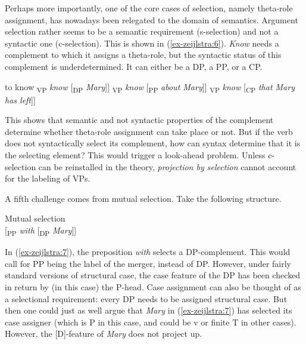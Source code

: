 \documentclass[output=paper
,modfonts
,nonflat]{langsci/langscibook}
\begin{document}
Perhaps more importantly, one of the core cases of selection, namely theta-role assignment, has nowadays been relegated to the domain of semantics. Argument selection rather seems to be a semantic requirement (s-selection) and not a syntactic one (c-selection). This is shown in (\ref{ex-zeijlstra:6}). \textit{Know} needs a complement to which it assigns a theta-role, but the syntactic status of this complement is underdetermined. It can either be a DP, a PP, or a CP. 

\begin{exe}
\ex to know \label{ex-zeijlstra:6}
	\xlist
	\ex {[}\textsubscript{VP} \textit{know} {[}\textsubscript{DP}
		\textit{Mary}{]}{]}
	\ex {[}\textsubscript{VP} \textit{know} {[}\textsubscript{PP} 	
		\textit{about Mary}{]}{]}
	\ex {[}\textsubscript{VP} \textit{know} {[}\textsubscript{CP} 		
		\textit{that Mary has left}{]}{]}
	\endxlist
\end{exe}
This shows that semantic and not syntactic properties of the complement determine whether theta-role assignment can take place or not. But if the verb does not syntactically select its complement, how can syntax determine that it is the selecting element? This would trigger a look-ahead problem. Unless c-selection can be reinstalled in the theory, \textit{projection by selection} cannot account for the labeling of VPs. 

A fifth challenge comes from mutual selection. Take the following structure.

\begin{exe}
\ex Mutual selection \label{ex-zeijlstra:7} \\
	{[}\textsubscript{PP} \textit{with} {[}\textsubscript{DP} \textit{Mary}{]}{]}
\end{exe}
In (\ref{ex-zeijlstra:7}), the preposition \textit{with} selects a DP-complement. This would call for PP being the label of the merger, instead of DP. However, under fairly standard versions of structural case, the case feature of the DP has been checked in return by (in this case) the P-head. Case assignment can also be thought of as a selectional requirement: every DP needs to be assigned structural case. But then one could just as well argue that \textit{Mary} in (\ref{ex-zeijlstra:7}) has selected its case assigner (which is P in this case, and could be v or finite T in other cases). However, the {[}D{]}-feature of \textit{Mary} does not project up.
\end{document}
